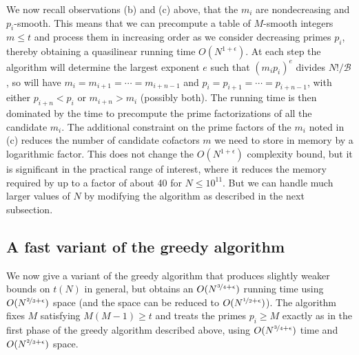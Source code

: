 \documentclass[12pt,a4paper,reqno]{amsart}
\numberwithin{equation}{section}
\theoremstyle{plain}
\theoremstyle{definition}
\newcommand\tuple{{\mathcal B}}
\begin{document}
We now recall observations (b) and (c) above, that the $m_i$ are nondecreasing and $p_i$-smooth.    This means that we can  precompute a table of $M$-smooth integers $m\le t$ and process them in increasing order as we consider decreasing primes $p_i$, thereby obtaining a quasilinear running time $O(N^{1+\epsilon})$. At each step the algorithm will determine the largest exponent $e$ such that $(m_i p_i)^e$ divides $N!/\tuple$, so will have $m_i=m_{i+1}=\cdots = m_{i+n-1}$ and $p_i=p_{i+1}=\cdots = p_{i+n-1}$, with either $p_{i+n}<p_i$ or $m_{i+n} > m_i$ (possibly both).
The running time is then dominated by the time to precompute the prime factorizations of all the candidate $m_i$.  The additional constraint on the prime factors of the $m_i$ noted in (c) reduces the number of candidate cofactors $m$ we need to store in memory by a logarithmic factor.  This does not change the $O(N^{1+\epsilon})$ complexity bound, but it is significant in the practical range of interest, where it reduces the memory required by up to a factor of about 40 for $N\le 10^{11}$.  But we can handle much larger values of $N$ by modifying the algorithm as described in the next subsection.

\subsection{A fast variant of the greedy algorithm}\label{sec:fast-greedy}
We now give a variant of the greedy algorithm that produces slightly weaker bounds on $t(N)$ in general, but obtains an $O(N^{\nicefrac{3}{4}+\epsilon})$ running time using $O(N^{\nicefrac{2}{3}+\epsilon})$ space (and the space can be reduced to $O(N^{\nicefrac{1}{2}+\epsilon})$).  The algorithm fixes $M$ satisfying $M(M-1)\ge t$ and treats the primes $p_i\ge M$ exactly as in the first phase of the greedy algorithm described above, using $O(N^{\nicefrac{3}{4}+\epsilon})$ time and $O(N^{\nicefrac{2}{3}+\epsilon})$ space.
\end{document}
